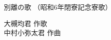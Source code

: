 \documentclass[10pt,b5j]{tarticle} %
\begin{document}
\begin{minipage}[c]{0.7\hsize} %
    \begin{center}
        {\LARGE
            別離の歌 %
        }
        {\small 
            （昭和6年閉寮記念寮歌） %
        }
    \end{center}
\end{minipage}
\begin{minipage}[c]{0.3\hsize} %
    \begin{flushright} %
        大槻均君 作歌\\中村小弥太君 作曲 %
    \end{flushright}
\end{minipage}
\end{document}
